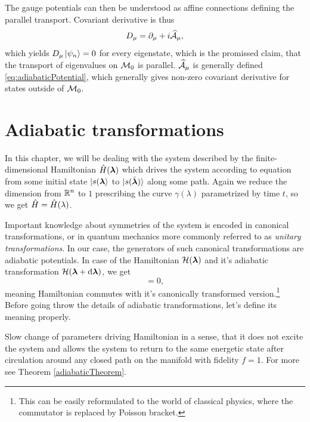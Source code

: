 The gauge potentials can then be understood as affine connections defining the parallel transport. Covariant derivative is thus
\begin{equation}
    D_\mu=\partial_\mu+i\AA_\mu,
\end{equation}
which yields $D_\mu\ket{\psi_n}=0$ for every eigenstate, which is the promissed claim, that the transport of eigenvalues on $\M_0$ is parallel. $\AA_\mu$ is generally defined \ref{eq:adiabaticPotential}, which generally gives non-zero covariant derivative for states outside of $\M_0$.




\section{Adiabatic transformations}
In this chapter, we will be dealing with the system described by the finite-dimensional Hamiltonian $\HH(\llambda)$ which drives the system according to \Schrodinger equation from some initial state $\ket{s(\llambda}$ to $\ket{s(\tilde\llambda)}$ along some path. Again we reduce the dimension from $\R^n$ to $1$ prescribing the curve $\gamma(\lambda)$ parametrized by time $t$, so we get $\HH=\HH(\lambda)$.


Important knowledge about symmetries of the system is encoded in canonical transformations, or in quantum mechanics more commonly referred to as \emph{unitary transformations}. In our case, the generators of such canonical transformations are adiabatic potentials. In case of the Hamiltonian $\H(\llambda)$ and it's adiabatic transformation $\H(\llambda+\d \llambda)$, we get
\begin{equation}
    [\HH(\llambda),\HH(\llambda+\delta \llambda)]=0,
\end{equation}
meaning Hamiltonian commutes with it's canonically transformed version.\footnote{This can be easily reformulated to the world of classical physics, where the commutator is replaced by Poisson bracket.} Before going throw the details of adiabatic transformations, let's define its meaning properly.

\begin{definition}[Adibaticity]
    Slow change of parameters driving Hamiltonian in a sense, that it does not excite the system and allows the system to return to the same energetic state after circulation around any closed path on the manifold with fidelity $f=1$. For more see Theorem \ref{adiabaticTheorem}.
\end{definition}


